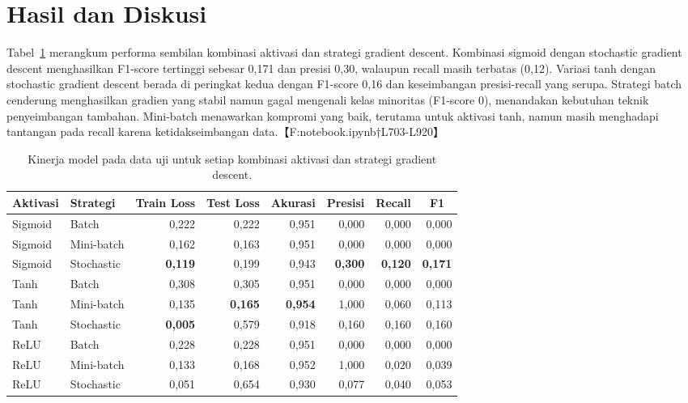 \documentclass[12pt]{article}
\begin{document}
\section*{Hasil dan Diskusi}
Tabel~\ref{tab:metrics} merangkum performa sembilan kombinasi aktivasi dan strategi gradient descent. Kombinasi sigmoid dengan stochastic gradient descent menghasilkan F1-score tertinggi sebesar 0,171 dan presisi 0,30, walaupun recall masih terbatas (0,12). Variasi tanh dengan stochastic gradient descent berada di peringkat kedua dengan F1-score 0,16 dan keseimbangan presisi-recall yang serupa. Strategi batch cenderung menghasilkan gradien yang stabil namun gagal mengenali kelas minoritas (F1-score 0), menandakan kebutuhan teknik penyeimbangan tambahan. Mini-batch menawarkan kompromi yang baik, terutama untuk aktivasi tanh, namun masih menghadapi tantangan pada recall karena ketidakseimbangan data.【F:notebook.ipynb†L703-L920】

\begin{table}[b]
    \centering
    \caption{Kinerja model pada data uji untuk setiap kombinasi aktivasi dan strategi gradient descent.}
    \label{tab:metrics}
    \small
    \begin{tabular}{llrrrrrr}
        \toprule
        Aktivasi & Strategi & \multicolumn{1}{c}{Train Loss} & \multicolumn{1}{c}{Test Loss} & \multicolumn{1}{c}{Akurasi} & \multicolumn{1}{c}{Presisi} & \multicolumn{1}{c}{Recall} & \multicolumn{1}{c}{F1} \\
        \midrule
        Sigmoid & Batch & 0{,}222 & 0{,}222 & 0{,}951 & 0{,}000 & 0{,}000 & 0{,}000 \\
        Sigmoid & Mini-batch & 0{,}162 & 0{,}163 & 0{,}951 & 0{,}000 & 0{,}000 & 0{,}000 \\
        Sigmoid & Stochastic & \textbf{0{,}119} & 0{,}199 & 0{,}943 & \textbf{0{,}300} & \textbf{0{,}120} & \textbf{0{,}171} \\
        Tanh & Batch & 0{,}308 & 0{,}305 & 0{,}951 & 0{,}000 & 0{,}000 & 0{,}000 \\
        Tanh & Mini-batch & 0{,}135 & \textbf{0{,}165} & \textbf{0{,}954} & 1{,}000 & 0{,}060 & 0{,}113 \\
        Tanh & Stochastic & \textbf{0{,}005} & 0{,}579 & 0{,}918 & 0{,}160 & 0{,}160 & 0{,}160 \\
        ReLU & Batch & 0{,}228 & 0{,}228 & 0{,}951 & 0{,}000 & 0{,}000 & 0{,}000 \\
        ReLU & Mini-batch & 0{,}133 & 0{,}168 & 0{,}952 & 1{,}000 & 0{,}020 & 0{,}039 \\
        ReLU & Stochastic & 0{,}051 & 0{,}654 & 0{,}930 & 0{,}077 & 0{,}040 & 0{,}053 \\
        \bottomrule
    \end{tabular}
\end{table}
\end{document}
